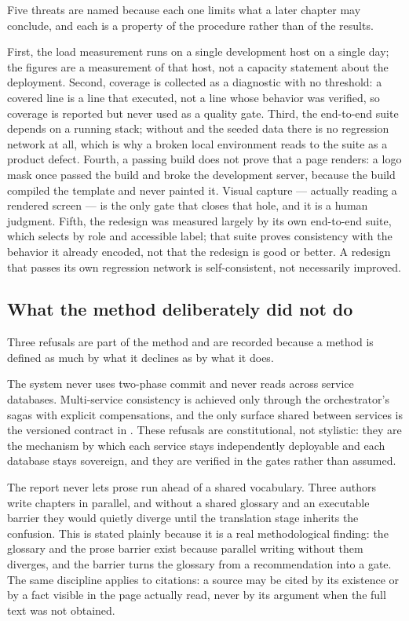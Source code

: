 Five threats are named because each one limits what a later chapter may
conclude, and each is a property of the procedure rather than of the results.

First, the load measurement runs on a single development host on a single day;
the figures are a measurement of that host, not a capacity statement about the
deployment. Second, coverage is collected as a diagnostic with no threshold: a
covered line is a line that executed, not a line whose behavior was verified,
so coverage is reported but never used as a quality gate. Third, the end-to-end
suite depends on a running stack; without  and the seeded data
there is no regression network at all, which is why a broken local environment
reads to the suite as a product defect. Fourth, a passing build does not prove
that a page renders: a logo mask once passed the build and broke the
development server, because the build compiled the template and never painted
it. Visual capture --- actually reading a rendered screen --- is the only gate
that closes that hole, and it is a human judgment. Fifth, the redesign was
measured largely by its own end-to-end suite, which selects by role and
accessible label; that suite proves consistency with the behavior it already
encoded, not that the redesign is good or better. A redesign that passes its
own regression network is self-consistent, not necessarily improved.

\subsection{What the method deliberately did not do}

Three refusals are part of the method and are recorded because a method is
defined as much by what it declines as by what it does.

The system never uses two-phase commit and never reads across service
databases. Multi-service consistency is achieved only through the
orchestrator's sagas with explicit compensations, and the only surface shared
between services is the versioned contract in . These refusals
are constitutional, not stylistic: they are the mechanism by which each service
stays independently deployable and each database stays sovereign, and they are
verified in the gates rather than assumed.

The report never lets prose run ahead of a shared vocabulary. Three authors
write chapters in parallel, and without a shared glossary and an executable
barrier they would quietly diverge until the translation stage inherits the
confusion. This is stated plainly because it is a real methodological finding:
the glossary and the prose barrier exist because parallel writing without them
diverges, and the barrier turns the glossary from a recommendation into a gate.
The same discipline applies to citations: a source may be cited by its
existence or by a fact visible in the page actually read, never by its argument
when the full text was not obtained.

